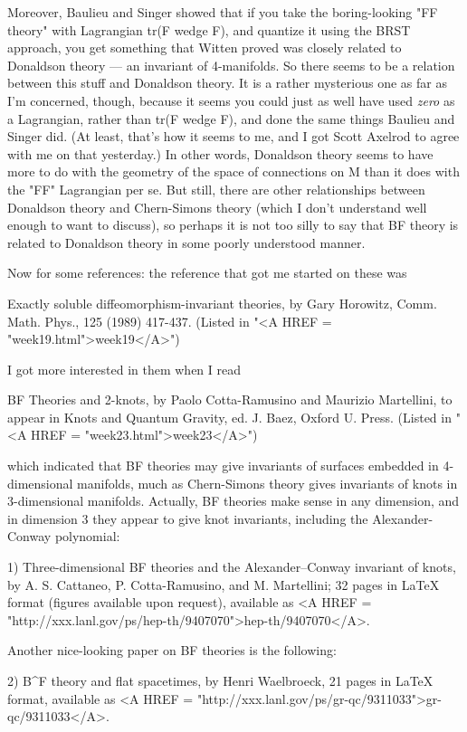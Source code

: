 Moreover, Baulieu and Singer showed that if you take the boring-looking 
"FF theory" with Lagrangian tr(F wedge F), and quantize it using the
BRST approach, you get something that Witten proved was closely related
to Donaldson theory --- an invariant of 4-manifolds.  So there seems to
be a relation between this stuff and Donaldson theory.  It is a rather
mysterious one as far as I'm concerned, though, because it seems you
could just as well have used \emph{zero} as a Lagrangian, rather than tr(F
wedge F), and done the same things Baulieu and Singer did.   (At least,
that's how it seems to me, and I got Scott Axelrod to agree with me on
that yesterday.)  In other words, Donaldson theory seems to have more to
do with the geometry of the space of connections on M than it does with
the "FF" Lagrangian per se.  But still, there are other relationships
between Donaldson theory and Chern-Simons theory (which I don't
understand well enough to want to discuss), so perhaps it is not too
silly to say that BF theory is related to Donaldson theory in some
poorly understood manner.   

Now for some references: the reference that got me started on these was

Exactly soluble diffeomorphism-invariant theories, by Gary Horowitz,
Comm. Math. Phys., 125 (1989) 417-437. (Listed in "<A HREF = "week19.html">week19</A>")

I got more interested in them when I read

BF Theories and 2-knots, by Paolo Cotta-Ramusino and Maurizio
Martellini, to appear in Knots and Quantum Gravity, ed. J. Baez, Oxford
U. Press.  (Listed in "<A HREF = "week23.html">week23</A>")

which indicated that BF theories may give invariants of surfaces
embedded in 4-dimensional manifolds, much as Chern-Simons theory gives
invariants of knots in 3-dimensional manifolds.  Actually, BF theories
make sense in any dimension, and in dimension 3 they appear to give knot
invariants, including the Alexander-Conway polynomial:

1) Three-dimensional BF theories and the Alexander--Conway invariant of
knots, by A. S. Cattaneo, P. Cotta-Ramusino, and M. Martellini; 32 pages
in LaTeX format (figures available upon request), available as
<A HREF = "http://xxx.lanl.gov/ps/hep-th/9407070">hep-th/9407070</A>.  

Another nice-looking paper on BF theories is the following:

2) B^F theory and flat spacetimes, by Henri Waelbroeck, 21 pages in
LaTeX format, available as <A HREF = "http://xxx.lanl.gov/ps/gr-qc/9311033">gr-qc/9311033</A>.  

